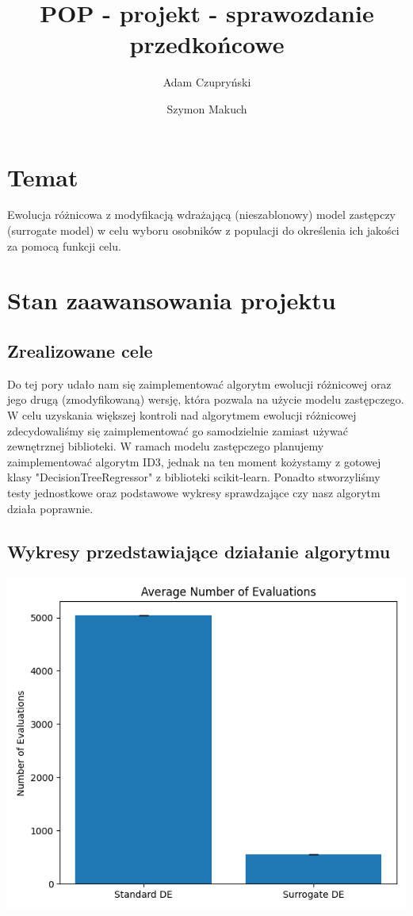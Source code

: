 \documentclass{article}
\begin{document}
\title{POP - projekt - sprawozdanie przedkońcowe}
\author{Adam Czupryński \and Szymon Makuch}
\maketitle

\section{Temat}
Ewolucja różnicowa z modyfikacją wdrażającą (nieszablonowy) model zastępczy (surrogate model) w celu wyboru osobników z populacji do określenia ich jakości za pomocą funkcji celu.


\section{Stan zaawansowania projektu}
\subsection{Zrealizowane cele}
Do tej pory udało nam się zaimplementować algorytm ewolucji różnicowej oraz jego drugą (zmodyfikowaną) wersję, która pozwala na użycie modelu zastępczego. W celu uzyskania większej kontroli nad algorytmem ewolucji różnicowej zdecydowaliśmy się zaimplementować go samodzielnie zamiast używać zewnętrznej biblioteki. 
W ramach modelu zastępczego planujemy zaimplementować algorytm ID3, jednak na ten moment kożystamy z gotowej klasy "DecisionTreeRegressor" z biblioteki scikit-learn.
Ponadto stworzyliśmy testy jednostkowe oraz podstawowe wykresy sprawdzające czy nasz algorytm działa poprawnie.

\subsection{Wykresy przedstawiające działanie algorytmu}
\includegraphics[scale=0.7]{results_evaluations.png}
\end{document}
